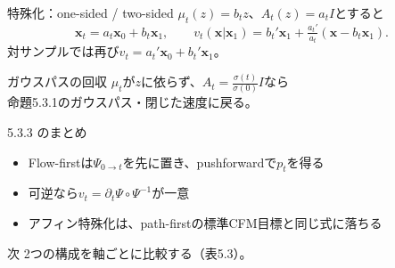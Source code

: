 \asmain
\begin{frame}{特殊化：one-sided / two-sided}
    $\mu_t(z)=b_t z$、$A_t(z)=a_t I$とすると
    \[
        \bm{x}_t=a_t\bm{x}_0+b_t\bm{x}_1,
        \qquad
        v_t(\bm{x}|\bm{x}_1)
        =
        b_t'\bm{x}_1+\tfrac{a_t'}{a_t}(\bm{x}-b_t\bm{x}_1).
    \]
    対サンプルでは再び$v_t=a_t'\bm{x}_0+b_t'\bm{x}_1$。
    \begin{block}{ガウスパスの回収}
        $\mu_t$が$z$に依らず、$A_t=\frac{\sigma(t)}{\sigma(0)}I$なら\\
        命題5.3.1のガウスパス・閉じた速度に戻る。
    \end{block}
\end{frame}
\asmain
\begin{frame}{5.3.3 のまとめ}
    \begin{itemize}
        \item Flow-firstは$\Psi_{0\to t}$を先に置き、pushforwardで$p_t$を得る
        \item 可逆なら$v_t=\partial_t\Psi\circ\Psi^{-1}$が一意
        \item アフィン特殊化は、path-firstの標準CFM目標と同じ式に落ちる
    \end{itemize}
    \begin{block}{次}
        2つの構成を軸ごとに比較する（表5.3）。
    \end{block}
\end{frame}
